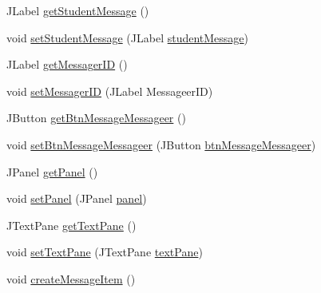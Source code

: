 \begin{DoxyCompactItemize}
\item 
J\+Label \mbox{\hyperlink{classcom_1_1_b_n_u_1_1pages_1_1message__board_1_1_message_model_af41a8f4610542c09e7b6795230771224}{get\+Student\+Message}} ()
\item 
void \mbox{\hyperlink{classcom_1_1_b_n_u_1_1pages_1_1message__board_1_1_message_model_a2be6da1f089b4cb12280ddc9f058fe03}{set\+Student\+Message}} (J\+Label \mbox{\hyperlink{classcom_1_1_b_n_u_1_1pages_1_1message__board_1_1_message_model_ac2fbc72420f4c1097f346f215d08014b}{student\+Message}})
\item 
J\+Label \mbox{\hyperlink{classcom_1_1_b_n_u_1_1pages_1_1message__board_1_1_message_model_a77854cdaddb85d2ccdc9f8218b51854a}{get\+Messager\+ID}} ()
\item 
void \mbox{\hyperlink{classcom_1_1_b_n_u_1_1pages_1_1message__board_1_1_message_model_adcdbe0b5b7077d2065f744b39962e221}{set\+Messager\+ID}} (J\+Label Messageer\+ID)
\item 
J\+Button \mbox{\hyperlink{classcom_1_1_b_n_u_1_1pages_1_1message__board_1_1_message_model_a78a47724a4e4f190a58bdb9cddb91cf5}{get\+Btn\+Message\+Messageer}} ()
\item 
void \mbox{\hyperlink{classcom_1_1_b_n_u_1_1pages_1_1message__board_1_1_message_model_a8d4b4e4f60179a5535759b67d7f5199b}{set\+Btn\+Message\+Messageer}} (J\+Button \mbox{\hyperlink{classcom_1_1_b_n_u_1_1pages_1_1message__board_1_1_message_model_a3733ef347e6881264132c4613369f3cf}{btn\+Message\+Messageer}})
\item 
J\+Panel \mbox{\hyperlink{classcom_1_1_b_n_u_1_1pages_1_1message__board_1_1_message_model_a1a3d6e521df3417bed391edc5c8ce1d2}{get\+Panel}} ()
\item 
void \mbox{\hyperlink{classcom_1_1_b_n_u_1_1pages_1_1message__board_1_1_message_model_a4442ee82a115e5691403e64475a848c6}{set\+Panel}} (J\+Panel \mbox{\hyperlink{classcom_1_1_b_n_u_1_1pages_1_1message__board_1_1_message_model_a6066901665c43ce5125901e2db42ec93}{panel}})
\item 
J\+Text\+Pane \mbox{\hyperlink{classcom_1_1_b_n_u_1_1pages_1_1message__board_1_1_message_model_a9cb747fae229304e5a668825d7138b3b}{get\+Text\+Pane}} ()
\item 
void \mbox{\hyperlink{classcom_1_1_b_n_u_1_1pages_1_1message__board_1_1_message_model_a974157167311233619c6c5ba926d1bb3}{set\+Text\+Pane}} (J\+Text\+Pane \mbox{\hyperlink{classcom_1_1_b_n_u_1_1pages_1_1message__board_1_1_message_model_a3dcf1aebf699a590c57664bf1a999348}{text\+Pane}})
\item 
void \mbox{\hyperlink{classcom_1_1_b_n_u_1_1pages_1_1message__board_1_1_message_model_ad90183139c715302ad514feb5e607e02}{create\+Message\+Item}} ()
\end{DoxyCompactItemize}
